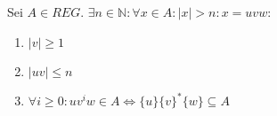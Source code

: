 Sei $A\in REG$. $\exists n\in\mathbb{N}:\forall x\in A:\mid x\mid>n:x=uvw:$
\begin{enumerate}
	\item $\mid v\mid\ge1$ \\
	\item $\mid uv\mid\le n$ \\
	\item $\forall i\ge0: uv^iw\in A\Leftrightarrow\{u\}\{v\}^*\{w\}\subseteq A$ 
\end{enumerate}